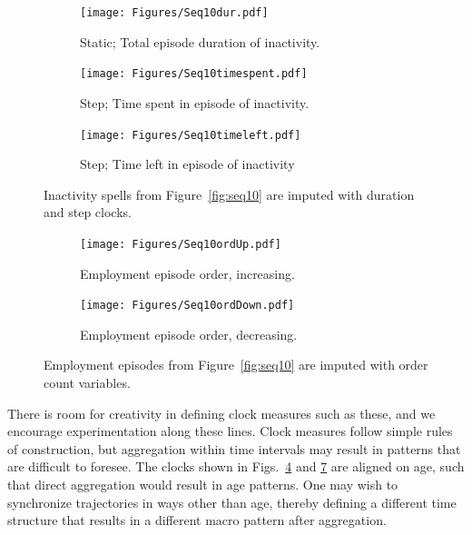 \documentclass{article}
\begin{document}
\begin{figure}[ht!]
\centering

\begin{subfigure}{\textwidth}
\texttt{[image: Figures/Seq10dur.pdf]}
\caption{Static; Total episode duration of inactivity.}
\label{fig:seq10dur}
\end{subfigure}

\begin{subfigure}{\textwidth}
\texttt{[image: Figures/Seq10timespent.pdf]}
\caption{Step; Time spent in episode of inactivity.}
\label{fig:seq10timespent}
\end{subfigure}

\begin{subfigure}{\textwidth}
\texttt{[image: Figures/Seq10timeleft.pdf]}
\caption{Step; Time left in episode of inactivity}
\label{fig:seq10timeleft}
\end{subfigure}
\caption{Inactivity spells from Figure~\ref{fig:seq10}
are imputed with duration and step clocks.}
\label{fig:spentleft}
\end{figure}

\begin{figure}[ht!]
\centering

\begin{subfigure}{\textwidth}
\texttt{[image: Figures/Seq10ordUp.pdf]}
\caption{Employment episode order, increasing.}
\label{fig:orderup}
\end{subfigure}

\begin{subfigure}{\textwidth}
\texttt{[image: Figures/Seq10ordDown.pdf]}
\caption{Employment episode order, decreasing.}
\label{fig:orderdown}
\end{subfigure}

\caption{Employment episodes from Figure~\ref{fig:seq10}
are imputed with order count variables.}
\label{fig:order}
\end{figure}

There is room for creativity in defining clock measures such as these, and we encourage experimentation along these lines. Clock measures follow simple rules of construction, but aggregation within time intervals may result in patterns that are difficult to foresee. The clocks shown in Figs.~\ref{fig:spentleft} and \ref{fig:order} are aligned on age, such that direct aggregation would result in age patterns.  One may wish to synchronize trajectories in ways other than age, thereby defining a different time structure that results in a different macro pattern after aggregation.
\end{document}
